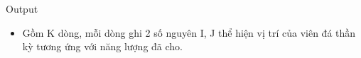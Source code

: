 Output
\begin{itemize}
	\item     Gồm K dòng, mỗi dòng ghi 2 số nguyên I, J thể hiện vị trí của viên đá thần kỳ tương ứng với năng lượng đã cho.   
\end{itemize}